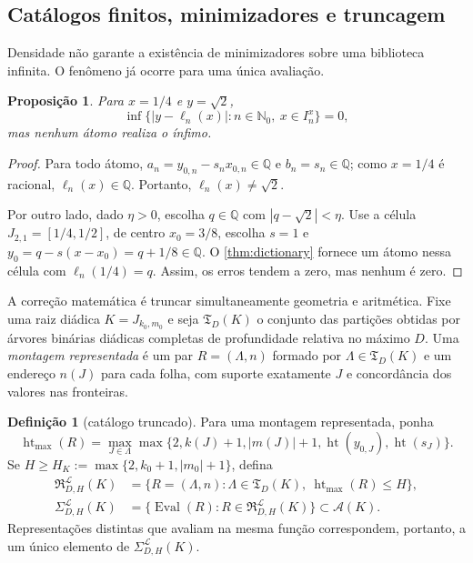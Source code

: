 \documentclass[11pt,a4paper]{article}
\newtheorem{proposition}[theorem]{Proposição}
\theoremstyle{definition}
\newtheorem{definition}[theorem]{Definição}
\theoremstyle{remark}
\newcommand{\Nzero}{\mathbb{N}_0}
\newcommand{\Aclass}{\mathcal{A}}
\newcommand{\Library}{\mathcal{L}}
\newcommand{\height}{\operatorname{ht}}
\begin{document}
\subsection{Catálogos finitos, minimizadores e truncagem}

Densidade não garante a existência de minimizadores sobre uma biblioteca
infinita. O fenômeno já ocorre para uma única avaliação.

\begin{proposition}\label{prop:no-minimizer}
Para $x=1/4$ e $y=\sqrt2$,
\[
 \inf\{|y-\ell_n(x)|:n\in\Nzero,\ x\in I_n^x\}=0,
\]
mas nenhum átomo realiza o ínfimo.
\end{proposition}

\begin{proof}
Para todo átomo, $a_n=y_{0,n}-s_nx_{0,n}\in\mathbb{Q}$ e
$b_n=s_n\in\mathbb{Q}$; como $x=1/4$ é racional,
$\ell_n(x)\in\mathbb{Q}$. Portanto, $\ell_n(x)\neq\sqrt2$.

Por outro lado, dado $\eta>0$, escolha $q\in\mathbb{Q}$ com
$|q-\sqrt2|<\eta$. Use a célula $J_{2,1}=[1/4,1/2]$, de centro $x_0=3/8$,
escolha $s=1$ e $y_0=q-s(x-x_0)=q+1/8\in\mathbb{Q}$. O
\cref{thm:dictionary} fornece um átomo nessa célula com
$\ell_n(1/4)=q$. Assim, os erros tendem a zero, mas nenhum é zero.
\end{proof}

A correção matemática é truncar simultaneamente geometria e aritmética. Fixe
uma raiz diádica $K=J_{k_0,m_0}$ e seja $\mathfrak T_D(K)$ o conjunto das
partições obtidas por árvores binárias diádicas completas de profundidade
relativa no máximo $D$. Uma \emph{montagem representada} é um par
$R=(\Lambda,n)$ formado por $\Lambda\in\mathfrak T_D(K)$ e um endereço
$n(J)$ para cada folha, com suporte exatamente $J$ e concordância dos valores
nas fronteiras.

\begin{definition}[catálogo truncado]\label{def:finite-catalog}
Para uma montagem representada, ponha
\[
 \height_{\max}(R)=\max_{J\in\Lambda}
 \max\{2,k(J)+1,|m(J)|+1,\height(y_{0,J}),\height(s_J)\}.
\]
Se
$H\ge H_K:=\max\{2,k_0+1,|m_0|+1\}$, defina
\begin{align}
 \mathfrak R_{D,H}^{\Library}(K)
   &=\{R=(\Lambda,n):\Lambda\in\mathfrak T_D(K),\
       \height_{\max}(R)\le H\},\label{eq:represented-catalog}\\
 \Sigma_{D,H}^{\Library}(K)
   &=\{\operatorname{Eval}(R):R\in
       \mathfrak R_{D,H}^{\Library}(K)\}\subset\Aclass(K).
 \label{eq:finite-catalog}
\end{align}
Representações distintas que avaliam na mesma função correspondem, portanto,
a um único elemento de $\Sigma_{D,H}^{\Library}(K)$.
\end{definition}
\end{document}
